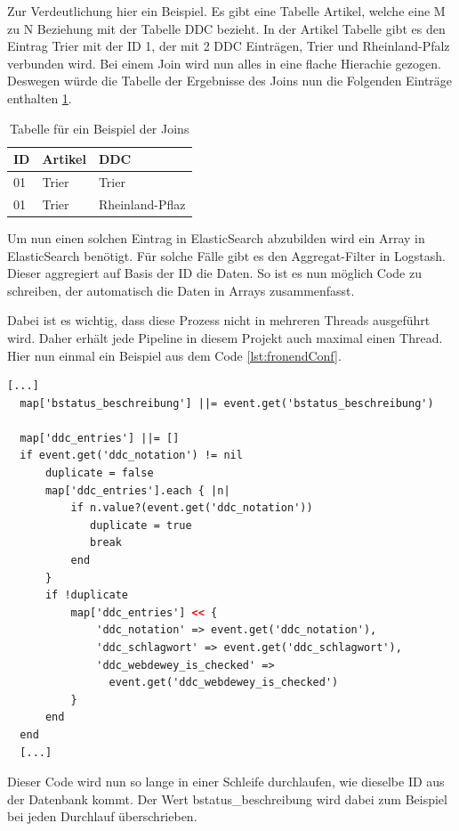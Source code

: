 Zur Verdeutlichung hier ein Beispiel.
Es gibt eine Tabelle Artikel, welche eine M zu N Beziehung mit der Tabelle DDC bezieht. In der Artikel Tabelle gibt es den Eintrag Trier mit der ID 1, der mit 2 DDC Einträgen, Trier und Rheinland-Pfalz verbunden wird. Bei einem Join wird nun alles in eine flache Hierachie gezogen. Deswegen würde die Tabelle der Ergebnisse des Joins nun die Folgenden Einträge enthalten \ref{tbl:join}.

\begin{table} %
	\centering
		\begin{tabular}{l | l | l}
		    \textbf{ID} & \textbf{Artikel} & \textbf{DDC} \\
        \hline
        01 & Trier & Trier \\
        01 & Trier & Rheinland-Pflaz  \\
		\end{tabular}
    \caption{Tabelle für ein Beispiel der Joins}
    \label{tbl:join}
\end{table}

Um nun einen solchen Eintrag in ElasticSearch abzubilden wird ein Array in ElasticSearch benötigt. Für solche Fälle gibt es den Aggregat-Filter in Logstash. Dieser aggregiert auf Basis der ID die Daten. So ist es nun möglich Code zu schreiben, der automatisch die Daten in Arrays zusammenfasst.

Dabei ist es wichtig, dass diese Prozess nicht in mehreren Threads ausgeführt wird. Daher erhält jede Pipeline in diesem Projekt auch maximal einen Thread.
Hier nun einmal ein Beispiel aus dem Code \ref{lst:fronendConf}.


\begin{lstlisting}[language=XML, frame=single, label={lst:fronendConf}] 
  [...]
  map['bstatus_beschreibung'] ||= event.get('bstatus_beschreibung')

  map['ddc_entries'] ||= []
  if event.get('ddc_notation') != nil
      duplicate = false
      map['ddc_entries'].each { |n|
          if n.value?(event.get('ddc_notation'))
             duplicate = true
             break
          end
      }
      if !duplicate
          map['ddc_entries'] << {
              'ddc_notation' => event.get('ddc_notation'),
              'ddc_schlagwort' => event.get('ddc_schlagwort'),
              'ddc_webdewey_is_checked' => 
                event.get('ddc_webdewey_is_checked')
          }
      end
  end
  [...]
\end{lstlisting}

Dieser Code wird nun so lange in einer Schleife durchlaufen, wie dieselbe ID aus der Datenbank kommt. Der Wert bstatus\_beschreibung wird dabei zum Beispiel bei jeden Durchlauf überschrieben. 

